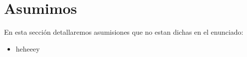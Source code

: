 \section{Asumimos}

En esta secci\'on detallaremos asumisiones que no estan dichas en el enunciado:

\begin{itemize}

\item heheeey

\end{itemize}


